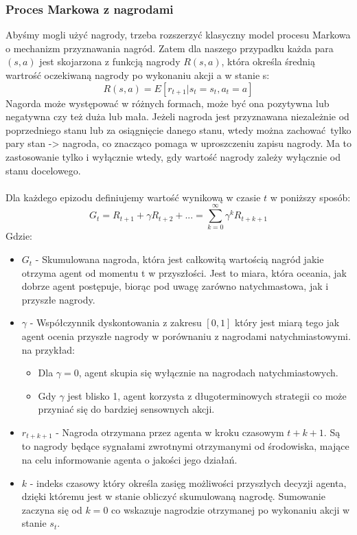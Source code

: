 \documentclass[a4paper, 12pt]{article}
\begin{document}
    \subsubsection{Proces Markowa z nagrodami}
    Abyśmy mogli użyć nagrody, trzeba rozszerzyć klasyczny model procesu Markowa o mechanizm przyznawania nagród.
    Zatem dla naszego przypadku każda para \( (s,a) \) jest skojarzona z funkcją nagrody \( R(s,a) \), która określa średnią wartrość oczekiwaną nagrody po wykonaniu
    akcji a w stanie s:
    \[ R(s,a) = E[r_{t+1}|s_t = s_t, a_t = a] \]
    Nagorda może występować w różnych formach, może być ona pozytywna lub negatywna czy też duża lub mała. Jeżeli nagroda jest
    przyznawana niezależnie od poprzedniego stanu lub za osiągnięcie danego stanu, wtedy można zachować tylko pary stan -> nagroda, co znacząco
    pomaga w uproszczeniu zapisu nagrody. Ma to zastosowanie tylko i wyłącznie wtedy, gdy wartość nagrody zależy wyłącznie 
    od stanu docelowego.
    \\ \\
    Dla każdego epizodu definiujemy wartość wynikową w czasie \( t \) w poniższy sposób:
    \[ G_t = R_{t+1} + \gamma R_{t+2} + ... = \sum_{k=0}^{\infty} \gamma^k R_{t+k+1} \]
    Gdzie:
    \begin{itemize}
        \item \( G_t \) - Skumulowana nagroda, która jest całkowitą wartością nagród jakie otrzyma agent od momentu t w przyszłości.
        Jest to miara, która oceania, jak dobrze agent postępuje, biorąc pod uwagę zarówno natychmastowa, jak i przyszłe nagrody.
        \item \( \gamma \) - Współczynnik dyskontowania z zakresu \( [0, 1] \) który jest miarą tego jak agent ocenia przyszłe nagrody w porównaniu z 
        nagrodami natychmiastowymi. na przykład:
        \begin{itemize}
            \item Dla \( \gamma = 0 \), agent skupia się wyłącznie na nagrodach natychmiastowych.
            \item Gdy \( \gamma \) jest blisko 1, agent korzysta z długoterminowych strategii co może przyniać się do bardziej sensownych akcji. 
        \end{itemize}
        \item \( r_{t+k+1} \) - Nagroda otrzymana przez agenta w kroku czasowym \( t + k + 1 \). Są to nagrody będące sygnałami zwrotnymi otrzymanymi
        od środowiska, mające na celu informowanie agenta o jakości jego działań.
        \item \( k \) - indeks czasowy który określa zasięg możliwości przyszłych decyzji agenta, dzięki któremu jest w stanie obliczyć skumulowaną nagrodę.
        Sumowanie zaczyna się od \( k = 0 \) co wskazuje nagrodzie otrzymanej po wykonaniu akcji w stanie \( s_t \).
    \end{itemize}
\end{document}
